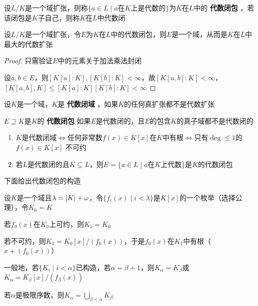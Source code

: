 \documentclass[11pt]{article}
\begin{document}
\begin{definition}[]
设\(L/K\)是一个域扩张，则称\(\{a\in L\mid a\text{在}K\text{上是代数的}\}\)为\(K\)在\(L\)中的 \textbf{代数闭包}
，若该闭包是\(K\)子自己，则称\(K\)在\(L\)中代数闭
\end{definition}

\begin{corollary}[]
设\(L/K\)是一个域扩张，令\(E\)为\(K\)在\(L\)中的代数闭包，则\(E\)是一个域，从而是\(K\)在\(L\)中
最大的代数扩张
\end{corollary}

\begin{proof}
只需验证\(E\)中的元素关于加法乘法封闭

设\(a,b\in E\)，则\([K[a]:K],[K[b]:K]<\infty\)，故\([K[a,b]:K]<\infty\)，
\([K[a,b],K]\le[K[a]:K][K[b]:K]<\infty\)
\end{proof}

\begin{definition}[]
设\(K\)是一个域，\(K\)是 \textbf{代数闭域} ，如果\(K\)的任何真扩张都不是代数扩张

\(E\supseteq K\)是\(K\)的 \textbf{代数闭包} 如果\(E\)是代数闭的，且\(E\)的包含\(K\)的真子域都不是代数闭的
\end{definition}

\begin{remark}
\begin{enumerate}
\item \(K\)是代数闭域\(\Leftrightarrow\)任何非常数\(f(x)\in K[x]\)在\(K\)中有根\(\Leftrightarrow\)只有\(\deg\le 1\)的\(f(x)\in K[x]\)
不可约
\item 若\(L\)是代数闭的且\(K\subseteq L\)，则\(E=\{a\in L\mid a\text{在$K$上代数}\}\)是\(K\)的代数闭包
\end{enumerate}
\end{remark}

下面给出代数闭包的构造

设\(K\)是一个域且\(\lambda=\abs{K}+\omega\)，令\(\{f_i(x)\mid i<\lambda\}\)是\(K[x]\)的一个枚举（选择公理），令\(K_0=K\)

若\(f_0(x)\)在\(K_0\)上可约，则\(K_1=K_0\)

若不可约，则\(K_1=K_0[x]/(f_0(x))\)，于是\(f_0(x)\)在\(K_1\)中有根（\(x+(f_0(x))\)）

一般地，若\(\{K_i\mid i<\alpha\}\)已构造，若\(\alpha=\beta+1\)，则\(K_\alpha=K_\beta\)或\(K_\alpha=K_\beta[x]/(f_\beta(x))\)

若\(\alpha\)是极限序数，则\(K_\alpha=\bigcup_{\beta<\alpha}K_\beta\)
\end{document}
